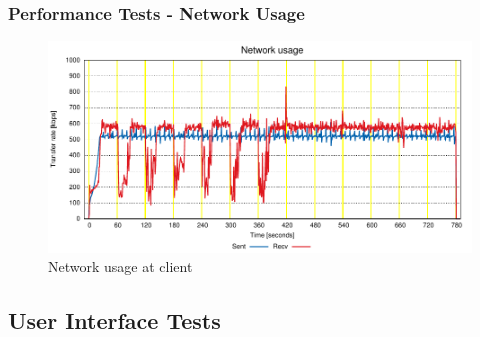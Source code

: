 \documentclass[compress]{beamer}
\begin{document}
	\begin{frame}[c]
		\frametitle{Performance Tests - Network Usage}
		\begin{figure}[H]
			\includegraphics[width=\textwidth]{figures/net_clt.pdf}
			\caption{Network usage at client}
		\end{figure}
	\end{frame}

\subsection{User Interface Tests}
\end{document}

